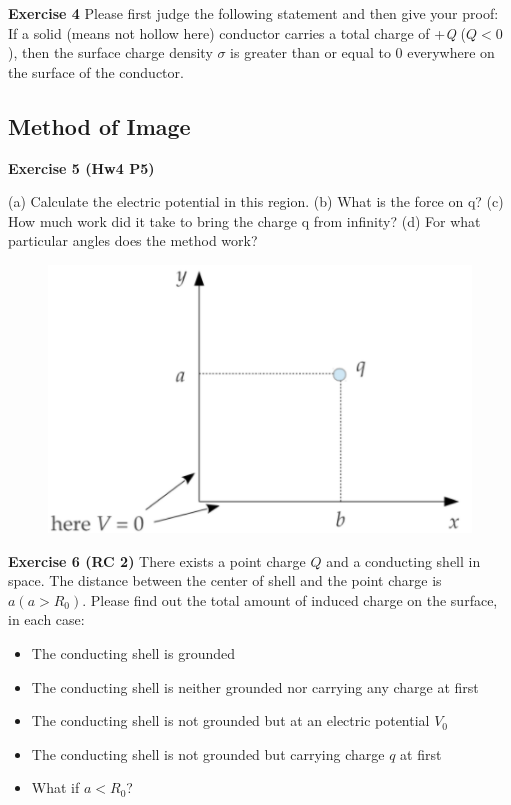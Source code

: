 \documentclass{beamer}
\begin{document}
\begin{frame}{\bf Exercise 4}
    Please first judge the following statement and then give your proof:\\
    If a solid (means not hollow here) conductor carries a total charge of +\textit{Q} ($Q<0$), 
    then the surface charge density $\sigma$ is greater than or equal to 0 everywhere on the surface of the conductor.
\end{frame}


\subsection{\bf Method of Image}


\begin{frame}{\bf Exercise 5 (Hw4 P5)}
    
(a) Calculate the electric potential in this region. 
(b) What is the force on q? (c) How much work did it take to bring the charge q from inﬁnity? 
(d) For what particular angles does the method work?
    
\begin{figure}
    \centering
    \includegraphics[scale=0.75]{images/ex5.png}
\end{figure}

\end{frame}

\begin{frame}{\bf Exercise 6 (RC 2)}
    There exists a point charge $Q$ and a conducting shell in space. The distance between the center of shell 
    and the point charge is $a(a>R_0)$. Please find out the total amount of induced charge on the surface, in each case:
    \begin{itemize}
        \item The conducting shell is grounded
        \item The conducting shell is neither grounded nor carrying any charge at first
        \item The conducting shell is not grounded but at an electric potential $V_0$
        \item The conducting shell is not grounded but carrying charge $q$ at first
        \item What if $a<R_0$?
    \end{itemize}
\end{frame}
\end{document}
